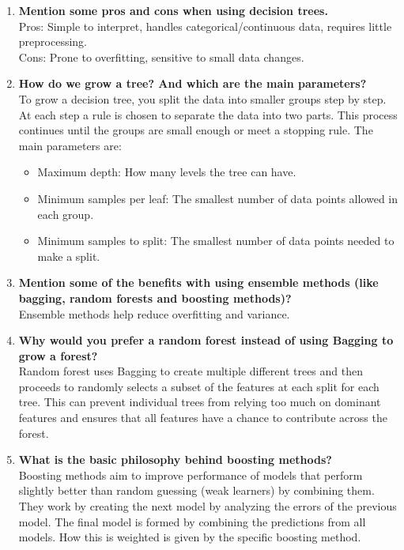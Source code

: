 \documentclass[a4paper,12pt]{article}
\begin{document}
	\begin{enumerate}
		\item \textbf{Mention some pros and cons when using decision trees.} \\
		Pros: Simple to interpret, handles categorical/continuous data, requires little preprocessing. \\
		Cons: Prone to overfitting, sensitive to small data changes.
		
		\item \textbf{How do we grow a tree? And which are the main parameters?} \\
		To grow a decision tree, you split the data into smaller groups step by step. At each step a rule is chosen to separate the data into two parts. This process continues until the groups are small enough or meet a stopping rule. The main parameters are:
		\begin{itemize}
			\item Maximum depth: How many levels the tree can have.
			\item Minimum samples per leaf: The smallest number of data points allowed in each group.
			\item Minimum samples to split: The smallest number of data points needed to make a split.
		\end{itemize}

		
		\item \textbf{Mention some of the benefits with using ensemble methods (like bagging, random forests and boosting methods)?} \\
		Ensemble methods help reduce overfitting and variance.
		
		\item \textbf{Why would you prefer a random forest instead of using Bagging to grow a forest?} \\
		Random forest uses Bagging to create multiple different trees and then proceeds to randomly selects a subset of the features at each split for each tree. This can prevent individual trees from relying too much on dominant features and ensures that all features have a chance to contribute across the forest. 
		
		\item \textbf{What is the basic philosophy behind boosting methods?} \\
		Boosting methods aim to improve performance of models that perform slightly better than random guessing (weak learners) by combining them. They work by creating the next model by analyzing the errors of the previous model. The final model is formed by combining the predictions from all models. How this is weighted is given by the specific boosting method. 

	\end{enumerate}
	
\end{document}

